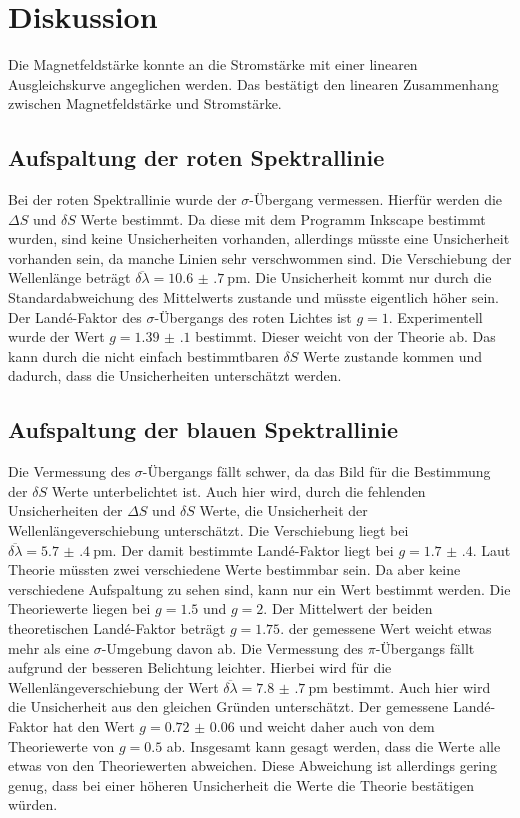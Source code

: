 \section{Diskussion}

Die Magnetfeldstärke konnte an die Stromstärke mit einer linearen Ausgleichskurve angeglichen werden. 
Das bestätigt den linearen Zusammenhang zwischen Magnetfeldstärke und Stromstärke.

\subsection{Aufspaltung der roten Spektrallinie}

Bei der roten Spektrallinie wurde der $\sigma$-Übergang vermessen. Hierfür werden die $\Delta S$ und $\delta S$ 
Werte bestimmt. Da diese mit dem Programm Inkscape \cite{Inkscape} bestimmt wurden, sind keine Unsicherheiten vorhanden, allerdings 
müsste eine Unsicherheit vorhanden sein, da manche Linien sehr verschwommen sind. Die Verschiebung der Wellenlänge 
beträgt $\overline{\delta\lambda} = \SI{10.6(7)}{\pico\meter}$. Die Unsicherheit kommt nur durch die Standardabweichung des 
Mittelwerts zustande und müsste eigentlich höher sein.
Der Landé-Faktor des $\sigma$-Übergangs des roten Lichtes ist $g=1$. Experimentell wurde der Wert $g=\num{1.39(10)}$ 
bestimmt. Dieser weicht von der Theorie ab. Das kann durch die nicht einfach bestimmtbaren $\delta S$ Werte zustande kommen und 
dadurch, dass die Unsicherheiten unterschätzt werden.

\subsection{Aufspaltung der blauen Spektrallinie}

Die Vermessung des $\sigma$-Übergangs fällt schwer, da das Bild für die Bestimmung der $\delta S$ Werte unterbelichtet ist.
Auch hier wird, durch die fehlenden Unsicherheiten der $\Delta S$ und $\delta S$ Werte, die Unsicherheit der 
Wellenlängeverschiebung unterschätzt. Die Verschiebung liegt bei $\overline{\delta\lambda} = \SI{5.7(4)}{\pico\meter}$.
Der damit bestimmte Landé-Faktor liegt bei $g=\num{1.7(4)}$. Laut Theorie müssten zwei verschiedene Werte bestimmbar sein.
Da aber keine verschiedene Aufspaltung zu sehen sind, kann nur ein Wert bestimmt werden. Die Theoriewerte liegen bei 
$g=\num{1.5}$ und $g=2$. Der Mittelwert der beiden theoretischen Landé-Faktor beträgt $g=\num{1.75}$. der gemessene Wert weicht 
etwas mehr als eine $\sigma$-Umgebung davon ab.
Die Vermessung des $\pi$-Übergangs fällt aufgrund der besseren Belichtung leichter.
Hierbei wird für die Wellenlängeverschiebung der Wert $\overline{\delta\lambda} = \SI{7.8(7)}{\pico\meter}$ bestimmt. 
Auch hier wird die Unsicherheit aus den gleichen Gründen unterschätzt.
Der gemessene Landé-Faktor hat den Wert $g=\num{0.72(6)}$ und weicht daher auch von dem Theoriewerte von $g=\num{0.5}$ ab.
Insgesamt kann gesagt werden, dass die Werte alle etwas von den Theoriewerten abweichen. Diese Abweichung ist allerdings gering genug, dass bei einer 
höheren Unsicherheit die Werte die Theorie bestätigen würden. 